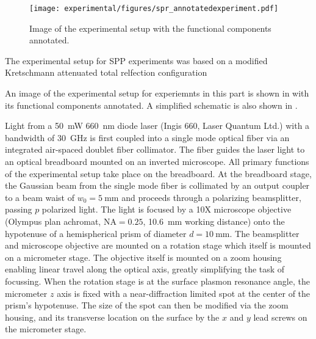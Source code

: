 \begin{figure}[ht]
 \centering
 \texttt{[image: experimental/figures/spr\_annotatedexperiment.pdf]}
 \caption{Image of the experimental setup with the functional
  components annotated.}
\label{fig:experimentalpicture}
\end{figure}


The experimental setup for SPP experiments was based on a modified Kretschmann
attenuated total relfection configuration

An image of the experimental setup for experiemnts in this part is shown in
 with its functional components annotated.  A
simplified schematic is also shown in .

Light from a \SI{50}{\milli\watt} \SI{660}{\nano\meter} diode laser (Ingis
660, Laser Quantum Ltd.) with a bandwidth of \SI{30}{\giga\hertz} is first
coupled into a single mode optical fiber via an integrated air-spaced
doublet fiber collimator.  The fiber guides the laser light to an optical
breadboard mounted on an inverted microscope.  All primary functions of the
experimental setup take place on the breadboard.  At the breadboard stage,
the Gaussian beam from the single mode fiber is collimated by an output
coupler to a beam waist of $w_0=\SI{5}{\milli\meter}$ and proceeds through
a polarizing beamsplitter, passing $p$ polarized light.  The light is
focused by a 10X microscope objective (Olympus plan achromat,
$\mathrm{NA}=0.25$, \SI{10.6}{\milli\meter} working distance) onto the
hypotenuse of a hemispherical prism of diameter $d=\SI{10}{\milli\meter}$.
The beamsplitter and microscope objective are mounted on a rotation stage
which itself is mounted on a micrometer stage.  The objective itself is
mounted on a zoom housing enabling linear travel along the optical axis,
greatly simplifying the task of focussing.  When the rotation stage is at
the surface plasmon resonance angle, the micrometer $z$ axis is fixed with
a near-diffraction limited spot at the center of the prism's hypotenuse.
The size of the spot can then be modified via the zoom housing, and its
transverse location on the surface by the $x$ and $y$ lead screws on the
micrometer stage.  

